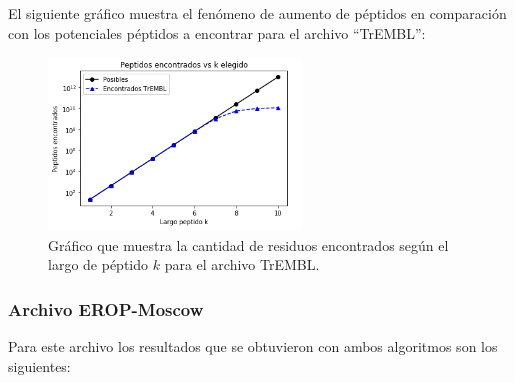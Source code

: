 El siguiente gráfico muestra el fenómeno de aumento de péptidos en comparación con los potenciales péptidos a encontrar para el archivo ``TrEMBL'':

\begin{figure}[h]
    \centering
    \includegraphics[width=0.6\textwidth]{./images/tremblv1.png}
    \caption{Gráfico que muestra la cantidad de residuos encontrados según el largo de péptido $k$ para el archivo TrEMBL.}
    \label{fig:trembl}
\end{figure}


\subsubsection{Archivo EROP-Moscow}

Para este archivo los resultados que se obtuvieron con ambos algoritmos son los siguientes:

